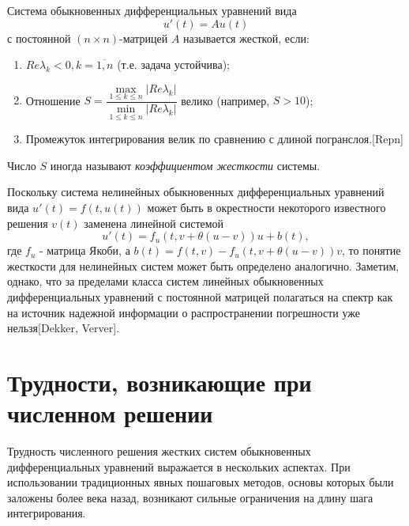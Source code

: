 \documentclass[a4paper,14pt]{extreport}
\begin{document}
  
\begin{Definition}Система обыкновенных дифференциальных уравнений вида
  \begin{equation}
  \label{stiff:eq}
    u'(t)=Au(t)
  \end{equation}
  с постоянной $(n \times n)$-матрицей $ A $ называется жесткой, если: 
  \begin{enumerate}
  \item $Re\lambda _k <0, k=\overbar{1,n}$ (т.е. задача устойчива);
  \item Отношение $S = \dfrac{\max\limits_{1\leq k\leq n} |Re\lambda _k|}{\min\limits_{1\leq k\leq n} |Re\lambda _k|} $ велико (например, $S > 10$);
  \item Промежуток интегрирования велик по сравнению с длиной погранслоя.[Repn]
  \end{enumerate}
\end{Definition}

Число $S$ иногда называют \textit{коэффициентом жесткости} системы. 


Поскольку система нелинейных обыкновенных дифференциальных уравнений вида $u'(t)=f(t, u(t))$ может быть в окрестности некоторого известного решения $v(t)$ заменена линейной системой 
$$u'(t) = f_u (t, v + \theta (u-v))u + b(t), $$
где $f_u$ - матрица Якоби, а $b(t) = f(t, v)-f_u(t,v + \theta (u-v))v$, то понятие жесткости для нелинейных систем может быть определено аналогично. Заметим, однако, что за пределами класса систем линейных обыкновенных дифференциальных уравнений с постоянной матрицей полагаться на спектр как на источник надежной информации о распространении погрешности уже нельзя[Dekker, Verver].

  
  \section{Трудности, возникающие при численном решении}
  \label{s:stiff_troubles} Трудность численного решения жестких систем обыкновенных дифференциальных уравнений выражается в нескольких аспектах. При использовании традиционных явных пошаговых методов, основы которых были заложены более века назад, возникают сильные ограничения на длину шага интегрирования.
  
\end{document}
